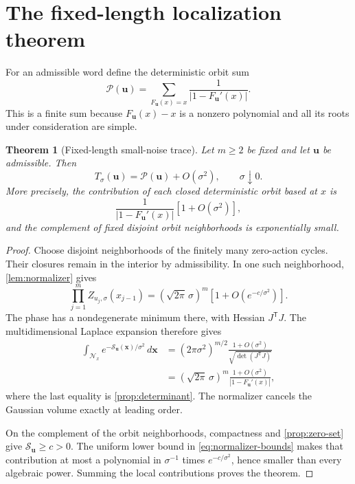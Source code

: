 \documentclass[11pt]{article}
\newtheorem{theorem}{Theorem}[section]
\theoremstyle{remark}
\newcommand{\cP}{\mathcal P}
\newcommand{\cS}{\mathcal S}
\newcommand{\cN}{\mathcal N}
\newcommand{\bu}{\boldsymbol u}
\newcommand{\bx}{\boldsymbol x}
\begin{document}
\section{The fixed-length localization theorem}
\label{sec:localization}

For an admissible word define the deterministic orbit sum
\begin{equation}
 \cP(\bu)=\sum_{F_{\bu}(x)=x}\frac1{|1-F_{\bu}'(x)|}.
 \label{eq:orbit-sum}
\end{equation}
This is a finite sum because $F_{\bu}(x)-x$ is a nonzero polynomial and all
its roots under consideration are simple.

\begin{theorem}[Fixed-length small-noise trace]
\label{thm:localization}
Let $m\ge2$ be fixed and let $\bu$ be admissible.  Then
\begin{equation}
 T_\sigma(\bu)=\cP(\bu)+O(\sigma^2),
 \qquad \sigma\downarrow0.
 \label{eq:main-localization}
\end{equation}
More precisely, the contribution of each closed deterministic orbit based at
$x$ is
\begin{equation}
 \frac1{|1-F_{\bu}'(x)|}\left[1+O(\sigma^2)\right],
 \label{eq:local-contribution}
\end{equation}
and the complement of fixed disjoint orbit neighborhoods is exponentially
small.
\end{theorem}

\begin{proof}
Choose disjoint neighborhoods of the finitely many zero-action cycles.  Their
closures remain in the interior by admissibility.  In one such neighborhood,
\cref{lem:normalizer} gives
\begin{equation*}
 \prod_{j=1}^m Z_{u_j,\sigma}(x_{j-1})
 =(\sqrt{2\pi}\,\sigma)^m[1+O(e^{-c/\sigma^2})].
\end{equation*}
The phase has a nondegenerate minimum there, with Hessian
$J^{\mathsf T}J$.  The multidimensional Laplace expansion
\citep{BleisteinHandelsman1986,Wong2001} therefore gives
\begin{align*}
 \int_{\cN_x}e^{-\cS_{\bu}(\bx)/\sigma^2}\,d\bx
 &=(2\pi\sigma^2)^{m/2}
 \frac{1+O(\sigma^2)}{\sqrt{\det(J^{\mathsf T}J)}}\\
 &=(\sqrt{2\pi}\,\sigma)^m
 \frac{1+O(\sigma^2)}{|1-F_{\bu}'(x)|},
\end{align*}
where the last equality is \cref{prop:determinant}.  The normalizer cancels
the Gaussian volume exactly at leading order.

On the complement of the orbit neighborhoods, compactness and
\cref{prop:zero-set} give $\cS_{\bu}\ge c>0$.  The uniform lower bound in
\eqref{eq:normalizer-bounds} makes that contribution at most a polynomial in
$\sigma^{-1}$ times $e^{-c/\sigma^2}$, hence smaller than every algebraic
power.  Summing the local contributions proves the theorem.
\end{proof}
\end{document}
